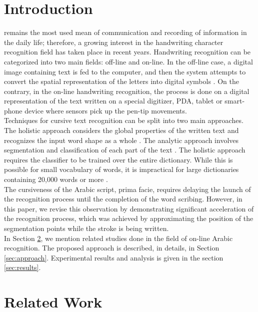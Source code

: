 \documentclass[10pt, conference, compsocconf]{IEEEtran}
\begin{document}
\section{Introduction}
\date
{} remains the most used mean of communication and recording of information in the daily life; therefore, a growing interest in the handwriting character recognition field has taken place in recent years. 
Handwriting recognition can be categorized into two main fields: off-line and on-line. 
In the off-line case, a digital image containing text is fed to the computer, and then the system attempts to convert the spatial representation of the letters into digital symbols \cite{al2011online}. 
On the contrary, in the on-line handwriting recognition, the process is done on a digital representation of the text written on a special digitizer, PDA, tablet or smart-phone device where sensors pick up the pen-tip movements.\\
 
Techniques for cursive text recognition can be split into two main approaches. 
The holistic approach considers the global properties of the written text and recognizes the input word shape as a whole \cite{biadsy2011segmentation, saabni2009hierarchical}. 
The analytic approach involves segmentation and classification of each part of the text \cite{abdulla2008off, sari2002off, Dinges2011}. 
The holistic approach requires the classifier to be trained over the entire dictionary. 
While this is possible for small vocabulary of words, it is impractical for large dictionaries containing 20,000 words or more \cite{elanwar2012unconstrained}.\\

The cursiveness of the Arabic script, prima facie, requires delaying the launch of the recognition process until the completion of the word scribing. 
However, in this paper, we revise this observation by demonstrating significant acceleration of the recognition process, which was achieved by approximating the position of the segmentation points while the stroke is being written.\\

In Section \ref{sec:related_work}, we mention related studies done in the field of on-line Arabic recognition. 
The proposed approach is described, in details, in Section \ref{sec:approach}. Experimental results and analysis is given in the section \ref{sec:results}. 

\section{Related Work}
\label{sec:related_work}
\end{document}
